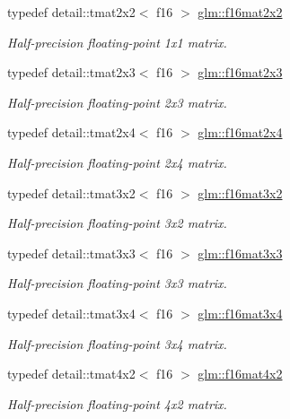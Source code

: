 \begin{DoxyCompactItemize}
typedef detail\-::tmat2x2$<$ f16 $>$ \hyperlink{group__gtc__type__precision_ga1f4b12c53051603b62e6fa69e3b7a98b}{glm\-::f16mat2x2}
\begin{DoxyCompactList}\small\item\em Half-\/precision floating-\/point 1x1 matrix. \end{DoxyCompactList}\item 
typedef detail\-::tmat2x3$<$ f16 $>$ \hyperlink{group__gtc__type__precision_ga8705b9a5a043c443df698f3274c7fc0e}{glm\-::f16mat2x3}
\begin{DoxyCompactList}\small\item\em Half-\/precision floating-\/point 2x3 matrix. \end{DoxyCompactList}\item 
typedef detail\-::tmat2x4$<$ f16 $>$ \hyperlink{group__gtc__type__precision_ga0764ac8adf2ac8909c100f9ce21eecba}{glm\-::f16mat2x4}
\begin{DoxyCompactList}\small\item\em Half-\/precision floating-\/point 2x4 matrix. \end{DoxyCompactList}\item 
typedef detail\-::tmat3x2$<$ f16 $>$ \hyperlink{group__gtc__type__precision_ga52ebf7495711e769a9191a10f668a28b}{glm\-::f16mat3x2}
\begin{DoxyCompactList}\small\item\em Half-\/precision floating-\/point 3x2 matrix. \end{DoxyCompactList}\item 
typedef detail\-::tmat3x3$<$ f16 $>$ \hyperlink{group__gtc__type__precision_gab97d7f311dd03dcbce714197878685fa}{glm\-::f16mat3x3}
\begin{DoxyCompactList}\small\item\em Half-\/precision floating-\/point 3x3 matrix. \end{DoxyCompactList}\item 
typedef detail\-::tmat3x4$<$ f16 $>$ \hyperlink{group__gtc__type__precision_gaebfd661385fe915a713b91654169a455}{glm\-::f16mat3x4}
\begin{DoxyCompactList}\small\item\em Half-\/precision floating-\/point 3x4 matrix. \end{DoxyCompactList}\item 
typedef detail\-::tmat4x2$<$ f16 $>$ \hyperlink{group__gtc__type__precision_ga1f933a7c0b489807dc22537b80f2e5f2}{glm\-::f16mat4x2}
\begin{DoxyCompactList}\small\item\em Half-\/precision floating-\/point 4x2 matrix. \end{DoxyCompactList}\item 

\end{DoxyCompactItemize}
